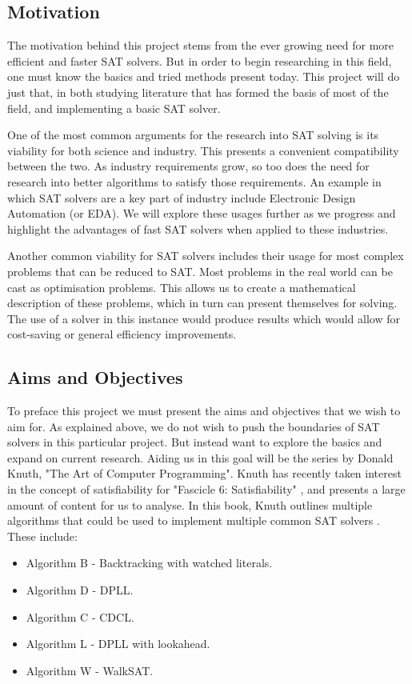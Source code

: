\documentclass{article}
\begin{document}
\subsection{Motivation}
The motivation behind this project stems from the ever growing need for more efficient and faster SAT solvers. But in order to 
begin researching in this field, one must know the basics and tried methods present today. This project will do just that, in 
both studying literature that has formed the basis of most of the field, and implementing a basic SAT solver.

One of the most common arguments for the research into SAT solving is its viability for both science and industry. This presents 
a convenient compatibility between the two. As industry requirements grow, so too does the need for research into better 
algorithms to satisfy those requirements. An example in which SAT solvers are a key part of industry include Electronic Design 
Automation (or EDA). We will explore these usages further as we progress and highlight the advantages of fast SAT solvers when 
applied to these industries.

Another common viability for SAT solvers includes their usage for most complex problems that can be reduced to SAT. Most problems 
in the real world can be cast as optimisation problems. This allows us to create a mathematical description of these problems, 
which in turn can present themselves for solving. The use of a solver in this instance would produce results which would allow 
for cost-saving or general efficiency improvements.

\subsection{Aims and Objectives}
To preface this project we must present the aims and objectives that we wish to aim for. As explained above, we do not wish to 
push the boundaries of SAT solvers in this particular project. But instead want to explore the basics and expand on current 
research. Aiding us in this goal will be the series by Donald Knuth, "The Art of Computer Programming". Knuth has recently taken 
interest in the concept of satisfiability for "Fascicle 6: Satisfiability" , and presents a large amount of content for us to 
analyse. In this book, Knuth outlines multiple algorithms that could be used to implement multiple common SAT solvers\cite{donald}
. These include:

\begin{itemize}
    \item Algorithm B - Backtracking with watched literals.
    \item Algorithm D - DPLL.
    \item Algorithm C - CDCL.
    \item Algorithm L - DPLL with lookahead.
    \item Algorithm W - WalkSAT.
\end{itemize}
\end{document}
